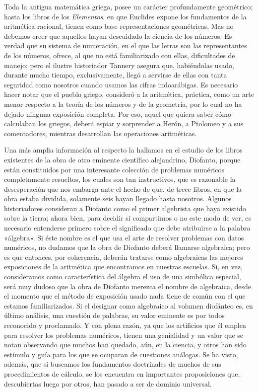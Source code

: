 \documentclass[a4paper, 12pt, draft]{article}
\begin{document}
{%


Toda la antigua matemática griega, posee un carácter profundamente geométrico; hasta los libros de los \textit{ Elementos}, en que Euclides expone los fundamentos de la aritmética racional, tienen como base representaciones geométricas. Mas no debemos creer que aquellos hayan descuidado la ciencia de los números. Es verdad que su sistema de numeración, en el que las letras son las representantes de los números, ofrece, al que no está familiarizado con ellas, dificultades de manejo; pero el ilustre historiador Tannery asegura que, habiéndolas usado, durante mucho tiempo, exclusivamente, llegó a servirse de ellas con tanta seguridad como nosotros cuando usamos las cifras indoarábigas. Es necesario hacer notar que el pueblo griego, consideró a la aritmética, práctica, como un arte menor respecto a la teoría de los números y de la geometría, por lo cual no ha dejado ninguna exposición completa. Por eso, aquel que quiera saber cómo calculaban los griegos, deberá espiar y sorprender a Herón, a Ptolomeo y a sus comentadores, mientras desarrollan las operaciones aritméticas.

Una más amplia información al respecto la hallamos en el estudio de los libros existentes de la obra de otro eminente científico alejandrino, Diofanto, porque están constituidos por una interesante colección de problemas numéricos completamente resueltos, los cuales son tan instructivos, que es razonable la desesperación que nos embarga ante el hecho de que, de trece libros, en que la obra estaba dividida, solamente seis hayan llegado hasta nosotros. Algunos historiadores consideran a Diofanto como el primer algebrista que haya existido sobre la tierra; ahora bien, para decidir si compartimos o no este modo de ver, es necesario entenderse primero sobre el significado que debe atribuirse a la palabra «álgebra». Si éste nombre es el que usa el arte de resolver problemas con datos numéricos, no dudamos que la obra de Diofanto deberá llamarse algebraica; pero es que entonces, por coherencia, deberán tratarse como algebraicas las mejores exposiciones de la aritmética que encontramos en nuestras escuelas. Si, en vez, consideramos como característica del álgebra el uso de una simbólica especial, será muy dudoso que la obra de Diofanto merezca el nombre de algebraica, desde el momento que el método de exposición usado nada tiene de común con el que estamos familiarizados. Si el designar como algebraico al volumen diofánteo es, en último análisis, una cuestión de palabras, su valor eminente es por todos reconocido y proclamado. Y con plena razón, ya que los artificios que él emplea para resolver los problemas numéricos, tienen una genialidad y un valor que se notan observando que muchos han quedado, aún, en la ciencia, y otros han sido estímulo y guía para los que se ocuparan de cuestiones análogas.  Se ha visto, además, que si buscamos los fundamentos doctrinales de muchos de sus procedimientos de cálculo, se los encuentra en importantes proposiciones que, descubiertas luego por otros, han pasado a ser de dominio universal.

}
\end{document}

